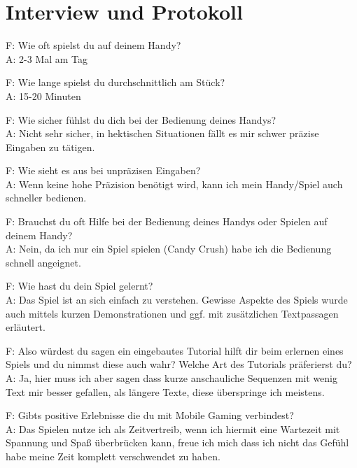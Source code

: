 \documentclass[12pt, a4paper]{article}
\begin{document}
\section{Interview und Protokoll}
\begin{flushleft}
F: Wie oft spielst du auf deinem Handy?\\
A: 2-3 Mal am Tag\newline

F: Wie lange spielst du durchschnittlich am Stück?\\
A: 15-20 Minuten\newline

F: Wie sicher fühlst du dich bei der Bedienung deines Handys?\\
A: Nicht sehr sicher, in hektischen Situationen fällt es mir schwer präzise Eingaben zu tätigen.\newline

F: Wie sieht es aus bei unpräzisen Eingaben?\\
A: Wenn keine hohe Präzision benötigt wird, kann ich mein Handy/Spiel auch schneller bedienen.\newline

F: Brauchst du oft Hilfe bei der Bedienung deines Handys oder Spielen auf deinem Handy?\\
A: Nein, da ich nur ein Spiel spielen (Candy Crush) habe ich die Bedienung schnell angeignet.\newline

F: Wie hast du dein Spiel gelernt?\\
A: Das Spiel ist an sich einfach zu verstehen. Gewisse Aspekte des Spiels wurde auch mittels kurzen Demonstrationen und ggf. mit zusätzlichen Textpassagen erläutert.\newline

F: Also würdest du sagen ein eingebautes Tutorial hilft dir beim erlernen eines Spiels und du nimmst diese auch wahr? Welche Art des Tutorials präferierst du?\\
A: Ja, hier muss ich aber sagen dass kurze anschauliche Sequenzen mit wenig Text mir besser gefallen, als längere Texte, diese überspringe ich meistens.\newline

F: Gibts positive Erlebnisse die du mit Mobile Gaming verbindest?\\
A: Das Spielen nutze ich als Zeitvertreib, wenn ich hiermit eine Wartezeit mit Spannung und Spaß überbrücken kann, freue ich mich dass ich nicht das Gefühl habe meine Zeit komplett verschwendet zu haben.\newline


\end{flushleft}
\end{document}

